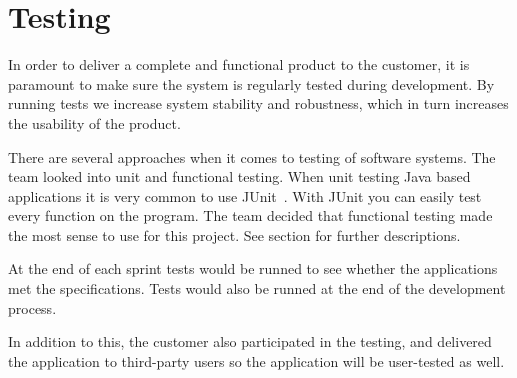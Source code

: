 \chapter{Testing}

In order to deliver a complete and functional product to the customer, it is paramount to make sure the system is regularly tested during development. 
By running tests we increase system stability and robustness, which in turn increases the usability of the product. 

There are several approaches when it comes to testing of software systems. The team looked into \gls{unit} and functional testing.  When unit testing Java based applications it is very common to use JUnit~\cite{junit}.
With JUnit you can easily test every function on the program. The team decided that functional testing made the most sense to use for this project. See section  for further descriptions.

At the end of each sprint tests would be runned to see whether the applications met the specifications. Tests would also be runned at the end of the development process. 

In addition to this, the customer also participated in the testing, and delivered the application to third-party users so the application will be user-tested as well.
\newpage

